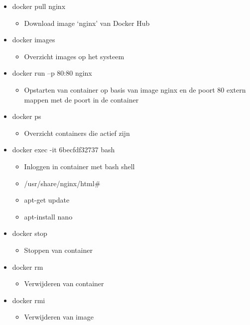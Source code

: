\documentclass{article}
\begin{document}
\begin{itemize}
    \item docker pull nginx
    \begin{itemize}
        \item Download image `nginx' van Docker Hub
    \end{itemize}
    \item docker images
    \begin{itemize}
        \item Overzicht images op het systeem
    \end{itemize}
    \item docker run –p 80:80 nginx
    \begin{itemize}
        \item Opstarten van container op basis van image nginx en de poort 80 extern mappen met de poort in de container
    \end{itemize}
    \item docker ps
    \begin{itemize}
        \item Overzicht containers die actief zijn
    \end{itemize}
    \item docker exec -it 6becfdf32737 bash
    \begin{itemize}
        \item Inloggen in container met bash shell
        \item /usr/share/nginx/html\#
        \item apt-get update
        \item apt-install nano
    \end{itemize}
    \item docker stop
    \begin{itemize}
        \item Stoppen van container
    \end{itemize}
    \item docker rm
    \begin{itemize}
        \item Verwijderen van container
    \end{itemize}
    \item docker rmi
    \begin{itemize}
        \item Verwijderen van image
    \end{itemize}
\end{itemize}
\end{document}
